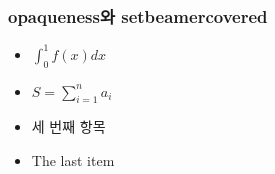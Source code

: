 \documentclass[xcolor=table]{beamer}
\begin{document}
\begin{frame}
\frametitle{opaqueness와 setbeamercovered}
\begin{itemize}
\item<1> $\int_0^1 f(x) dx$
\item<2> $S = \sum_{i=1}^n a_i$
\item<3> 세 번째 항목
\item<4> The last item
\end{itemize}
\end{frame}
\end{document}

